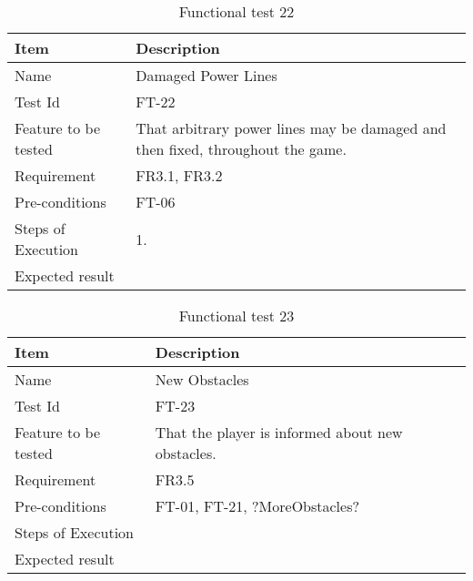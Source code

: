 \begin{table}[H]
\centering
	\begin{tabular}{ l | p{8cm} }
		\hline
		{\bf Item} & {\bf Description} \\ \hline
		Name & Damaged Power Lines \\ 
		Test Id & FT-22 \\ 
		Feature to be tested & That arbitrary power lines may be damaged and then fixed, throughout the game. \\ 
		Requirement & FR3.1, FR3.2  \\ 
		Pre-conditions & FT-06 \\ 
		Steps of Execution & 1. \\ 
		Expected result & \\ 
	\end{tabular}
	\caption{Functional test 22}
\end{table}

\begin{table}[H]
\centering
	\begin{tabular}{ l | p{8cm} }
		\hline
		{\bf Item} & {\bf Description} \\ \hline
		Name & New Obstacles \\ 
		Test Id & FT-23 \\ 
		Feature to be tested & That the player is informed about new obstacles. \\ 
		Requirement & FR3.5 \\ 
		Pre-conditions & FT-01, FT-21, ?MoreObstacles?\\ 
		Steps of Execution &  \\ 
		Expected result & \\ 
	\end{tabular}
	\caption{Functional test 23}
\end{table}